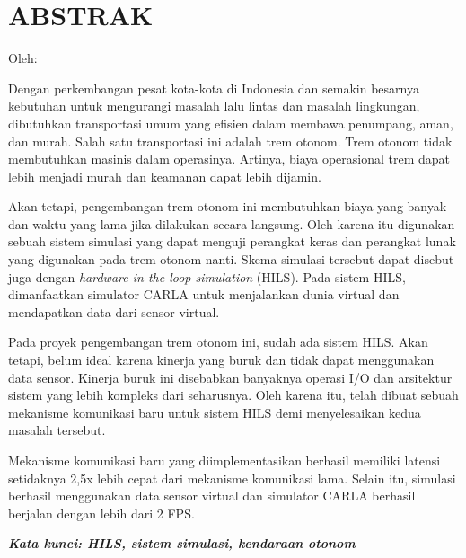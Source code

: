 \chapter*{ABSTRAK}

\begin{center}
	\bfseries \MakeUppercase{\thetitle}

	\normalfont\normalsize
	Oleh:

	\theauthor
\end{center}

\begin{singlespace}
	Dengan perkembangan pesat kota-kota di Indonesia dan semakin besarnya
	kebutuhan untuk mengurangi masalah lalu lintas dan masalah lingkungan,
	dibutuhkan transportasi umum yang efisien dalam membawa penumpang, aman, dan
	murah. Salah satu transportasi ini adalah trem otonom. Trem otonom tidak
	membutuhkan masinis dalam operasinya. Artinya, biaya operasional trem dapat
	lebih menjadi murah dan keamanan dapat lebih dijamin.

	Akan tetapi, pengembangan trem otonom ini membutuhkan biaya yang banyak dan
	waktu yang lama jika dilakukan secara langsung. Oleh karena itu digunakan
	sebuah sistem simulasi yang dapat menguji perangkat keras dan
	perangkat lunak yang digunakan pada trem otonom nanti. Skema simulasi
	tersebut dapat disebut juga dengan \textit{hardware-in-the-loop-simulation}
	(HILS). Pada sistem HILS, dimanfaatkan simulator CARLA untuk menjalankan
	dunia virtual dan mendapatkan data dari sensor virtual.

	Pada proyek pengembangan trem otonom ini, sudah ada sistem HILS. Akan
	tetapi, belum ideal karena kinerja yang buruk dan tidak dapat menggunakan
	data sensor. Kinerja buruk ini disebabkan banyaknya operasi I/O dan
	arsitektur sistem yang lebih kompleks dari seharusnya. Oleh karena itu,
	telah dibuat sebuah mekanisme komunikasi baru untuk sistem HILS demi
	menyelesaikan kedua masalah tersebut.

	Mekanisme komunikasi baru yang diimplementasikan berhasil memiliki latensi
	setidaknya 2,5x lebih cepat dari mekanisme komunikasi lama. Selain itu,
	simulasi berhasil menggunakan data sensor virtual dan simulator CARLA
	berhasil berjalan dengan lebih dari 2 FPS.

	\textbf{\textit{Kata kunci: HILS, sistem simulasi, kendaraan otonom}}
\end{singlespace}
\clearpage
